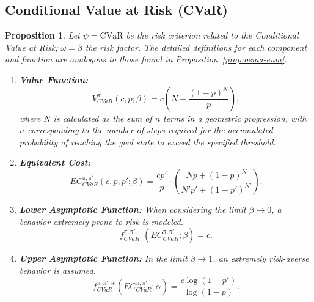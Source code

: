 \documentclass[runningheads]{llncs}
\newtheorem{proposition}{Proposition}
\begin{document}
\subsection{Conditional Value at Risk (CVaR)}

\begin{proposition}\label{prop:osma-cvar}
    Let $\psi = \text{CVaR}$ be the risk criterion related to the Conditional Value at Risk; $\omega = \beta$ the risk factor. The detailed definitions for each component and function are analogous to those found in Proposition~\ref{prop:osma-eum}.
    \begin{enumerate}
        \item \textbf{Value Function:}
        \begin{equation}
            V^{\pi}_{CVaR}(c, p; \beta) = c \left( N + \frac{(1 - p)^{N}}{p} \right),
        \end{equation}
        where $N$ is calculated as the sum of $n$ terms in a geometric progression, with $n$ corresponding to the number of steps required for the accumulated probability of reaching the goal state to exceed the specified threshold.
        
        \item \textbf{Equivalent Cost:}
        \begin{equation}
                EC^{\pi, \pi'}_{CVaR}(c, p, p'; \beta) = 
                \frac{c p'}{p} \cdot
                    \left( 
                        \frac
                        {N p + (1 - p)^{N}}
                        {N' p' + (1 - p')^{N'}}
                    \right).
        \end{equation}
        
        \item \textbf{Lower Asymptotic Function:} When considering the limit $\beta \to 0$, a behavior extremely prone to risk is modeled.
        \begin{equation}
            f^{\pi, \pi', -}_{CVaR}(EC^{\pi, \pi'}_{CVaR}; \beta) = c.
        \end{equation}
        
        \item \textbf{Upper Asymptotic Function:} In the limit $\beta \to 1$, an extremely risk-averse behavior is assumed.
        \begin{equation}
            f^{\pi, \pi', +}_{CVaR}(EC^{\pi, \pi'}_{CVaR}; \alpha) = 
            \frac
            {c \log( 1 - p')}
            { \log(1 - p) }.
        \end{equation}
    \end{enumerate}
\end{proposition} 
\end{document}
